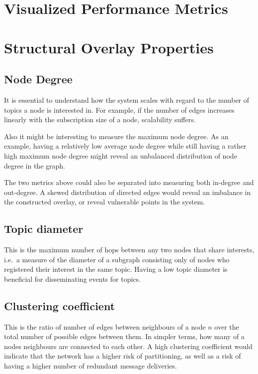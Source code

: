 
\section{Visualized Performance Metrics}

\section{Structural Overlay Properties}

\subsection{Node Degree}

It is essential to understand how the system scales with regard
to the number of topics a node is interested in. For example, if the number of
edges increases linearly with the subscription size of a node,
scalability suffers.

Also it might be interesting to measure the maximum node degree. As an
example, having a relatively low average node degree while still having
a rather high maximum node degree might reveal an unbalanced
distribution of node degree in the graph.

The two metrics above could also be separated into measuring both
in-degree and out-degree. A skewed distribution of directed edges
would reveal an imbalance in the constructed overlay, or reveal
vulnerable points in the system.

\subsection{Topic diameter}

This is the maximum number of hops between any two nodes that
share interests, i.e.\ a measure of the diameter of a subgraph
consisting only of nodes who registered their interest in the
same topic. Having a low topic diameter is beneficial for
disseminating events for topics.

\subsection{Clustering coefficient}

This is the ratio of number of edges between neighbours of a node $n$ over
the total number of possible edges between them. In simpler
terms, how
many of a nodes neighbours are connected to each other. A high
clustering coefficient would indicate that the network has a
higher risk of partitioning, as well as a risk of having a
higher number of redundant message deliveries.

